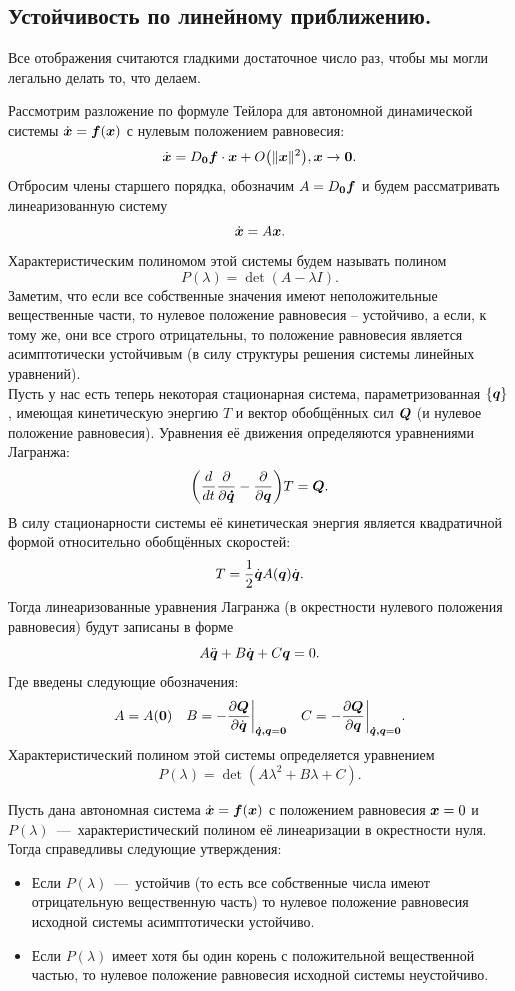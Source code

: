 \subsection{Устойчивость по линейному приближению.}
\begin{reminder}
    Все отображения считаются гладкими достаточное число раз, чтобы мы могли легально делать то, что делаем.
\end{reminder}
    Рассмотрим разложение по формуле Тейлора для автономной динамической системы $\dot{\boldsymbol{x}} = \boldsymbol{f}(\boldsymbol{x})$ с нулевым положением равновесия:
\[
    \dot{\boldsymbol{x}} = D_{\boldsymbol{0}}\boldsymbol{f} \cdot \boldsymbol{x} + O\big(\|\boldsymbol{x}\|^2\big), \boldsymbol{x} \rightarrow \boldsymbol{0}.
\]
    Отбросим члены старшего порядка, обозначим $A = D_{\boldsymbol{0}}\boldsymbol{f}$ и будем рассматривать линеаризованную систему
\[
    \dot{\boldsymbol{x}} = A\boldsymbol{x}.
\]
    Характеристическим полиномом этой системы будем называть полином
\[
    P(\lambda) = \det (A - \lambda I).
\]
    Заметим, что если все собственные значения имеют неположительные вещественные части, то нулевое положение равновесия -- устойчиво, а если, к тому же, они все строго отрицательны, то положение равновесия является асимптотически устойчивым (в силу структуры решения системы линейных уравнений). \\
Пусть у нас есть теперь некоторая стационарная система, параметризованная $\{\boldsymbol{q}\}$, имеющая кинетическую энергию $T$ и вектор обобщённых сил $\boldsymbol{Q}$ (и нулевое положение равновесия).
Уравнения её движения определяются уравнениями Лагранжа:
\[
    \biggr(\dfrac{d}{dt}\dfrac{\partial}{\partial \boldsymbol{\dot{q}}} - \dfrac{\partial}{\partial \boldsymbol{q}}\biggr)T = \boldsymbol{Q}.
\]
В силу стационарности системы её кинетическая энергия является квадратичной формой относительно обобщённых скоростей:
\[
    T = \dfrac{1}{2}\dot{\boldsymbol{q}}A(\boldsymbol{q})\dot{\boldsymbol{q}}.
\]
Тогда линеаризованные уравнения Лагранжа (в окрестности нулевого положения равновесия) будут записаны в форме
\[
    A\ddot{\boldsymbol{q}} + B\dot{\boldsymbol{q}} + C\boldsymbol{q} = 0.
\]
Где введены следующие обозначения:
\[
    A = A(\boldsymbol{0}) \quad B = -\dfrac{\partial \boldsymbol{Q}}{\partial \dot{\boldsymbol{q}}}\biggr|_{\boldsymbol{\dot{q}, q} = \boldsymbol{0}} \quad  C = -\dfrac{\partial \boldsymbol{Q}}{\partial \boldsymbol{q}}\biggr|_{\boldsymbol{\dot{q}, q} = \boldsymbol{0}}.
\]
Характеристический полином этой системы определяется уравнением
\[
    P(\lambda) = \det (A\lambda^2 + B\lambda + C).
\]
\begin{theorem}
    Пусть дана автономная система $\dot{\boldsymbol{x}} = \boldsymbol{f}(\boldsymbol{x})$ с положением равновесия $\boldsymbol{x} = 0$ и $P(\lambda)$~---~характеристический полином её линеаризации в окрестности нуля.
    Тогда справедливы следующие утверждения:
    \begin{itemize}
        \item Если $P(\lambda)$~---~устойчив (то есть все собственные числа имеют отрицательную вещественную часть) то нулевое положение равновесия исходной системы асимптотически устойчиво.
        \item Если $P(\lambda)$ имеет хотя бы один корень с положительной вещественной частью, то нулевое положение равновесия исходной системы неустойчиво.
    \end{itemize}
\end{theorem}
